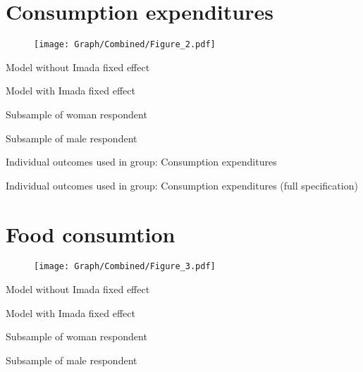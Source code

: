 \documentclass[10pt,a4paper]{article}
\begin{document}
\section{Consumption expenditures}
\begin{table}[H]\centering

\end{table}
\begin{figure}[H]\centering
\texttt{[image: Graph/Combined/Figure\_2.pdf]}
\caption{} \label{fig:Fig_2}
\end{figure}
\begin{table}[H]\centering\caption{Model without Imada fixed effect}

\end{table}
\begin{table}[H]\centering\caption{Model with Imada fixed effect}

\end{table}
\begin{table}[H]\centering\caption{Subsample of woman respondent}

\end{table}
\begin{table}[H]\centering\caption{Subsample of male respondent}

\end{table}

\begin{table}[H]\centering\caption{Individual outcomes used in group: Consumption expenditures }
\resizebox{\textwidth}{!}{}
\end{table}
\begin{table}[H]\centering\caption{Individual outcomes used in group: Consumption expenditures (full specification)}
\resizebox{\textwidth}{!}{}
\end{table}
\pagebreak
\section{Food consumtion}
\begin{table}[H]\centering

\end{table}
\begin{figure}[H]\centering
\texttt{[image: Graph/Combined/Figure\_3.pdf]}
\caption{} \label{fig:Fig_3}
\end{figure}
\begin{table}[H]\centering\caption{Model without Imada fixed effect}

\end{table}
\begin{table}[H]\centering\caption{Model with Imada fixed effect}

\end{table}
\begin{table}[H]\centering\caption{Subsample of woman respondent}

\end{table}
\begin{table}[H]\centering\caption{Subsample of male respondent}

\end{table}
\end{document}
